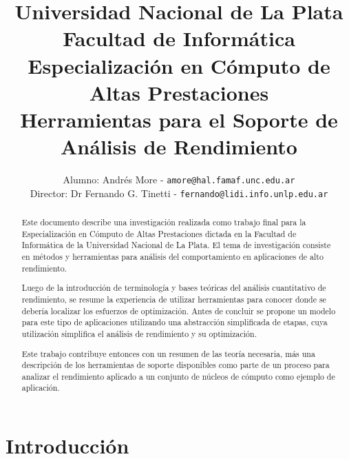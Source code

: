 \documentclass[a4paper]{report}
\begin{document}
\title{Universidad Nacional de La Plata\\Facultad de Inform\'atica\\ \bigskip
  Especializaci\'on en C\'omputo de Altas Prestaciones\\ \bigskip
  Herramientas para el Soporte de An\'alisis de Rendimiento}

\author{
  Alumno: Andr\'es More - {\tt amore@hal.famaf.unc.edu.ar}\\
  Director: Dr Fernando G. Tinetti - {\tt fernando@lidi.info.unlp.edu.ar}
}


\maketitle

\begin{abstract}

  Este documento describe una investigaci\'on realizada como trabajo final para
  la Especializaci\'on en C\'omputo de Altas Prestaciones dictada en la
  Facultad   de Inform\'atica de la Universidad Nacional de La Plata.
  El tema de investigaci\'on consiste en m\'etodos y herramientas para
  an\'alisis del comportamiento en aplicaciones de alto rendimiento.

  \bigskip

  Luego de la introducci\'on de terminolog\'ia y bases te\'oricas del
  an\'alisis cuantitativo de rendimiento, se resume la experiencia de utilizar
  herramientas para conocer donde se deber\'ia localizar los esfuerzos de
  optimizaci\'on. Antes de concluir se propone un modelo para este tipo de
  aplicaciones utilizando una abstracci\'on simplificada de etapas, cuya
  utilizaci\'on simplifica el an\'alisis de rendimiento y su optimizaci\'on.

  \bigskip

  Este trabajo contribuye entonces con un resumen de las teor\'ia necesaria,
  m\'as una descripci\'on de los herramientas de soporte disponibles como parte
  de un proceso para analizar el rendimiento aplicado a un conjunto de
  n\'ucleos de c\'omputo como ejemplo de aplicaci\'on.

\end{abstract}

\tableofcontents

\chapter{Introducci\'on}
\end{document}
